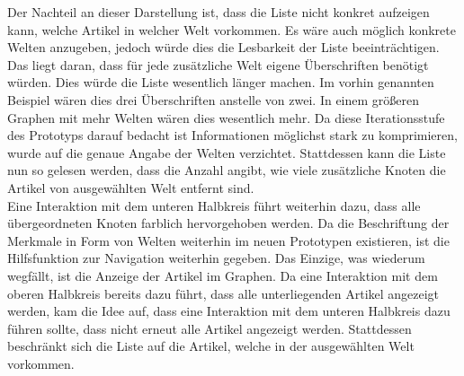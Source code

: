 Der Nachteil an dieser Darstellung ist, dass die Liste nicht konkret aufzeigen kann, welche Artikel in welcher Welt vorkommen.
Es wäre auch möglich konkrete Welten anzugeben, jedoch würde dies die Lesbarkeit der Liste beeinträchtigen.
Das liegt daran, dass für jede zusätzliche Welt eigene Überschriften benötigt würden.
Dies würde die Liste wesentlich länger machen.
Im vorhin genannten Beispiel wären dies drei Überschriften anstelle von zwei.
In einem größeren Graphen mit mehr Welten wären dies wesentlich mehr.
Da diese Iterationsstufe des Prototyps darauf bedacht ist Informationen möglichst stark zu komprimieren, wurde auf die genaue Angabe der Welten verzichtet.
Stattdessen kann die Liste nun so gelesen werden, dass die Anzahl angibt, wie viele zusätzliche Knoten die Artikel von ausgewählten Welt entfernt sind.\\

Eine Interaktion mit dem unteren Halbkreis führt weiterhin dazu, dass alle übergeordneten Knoten farblich hervorgehoben werden.
Da die Beschriftung der Merkmale in Form von Welten weiterhin im neuen Prototypen existieren, ist die Hilfsfunktion zur Navigation weiterhin gegeben.
Das Einzige, was wiederum wegfällt, ist die Anzeige der Artikel im Graphen.
Da eine Interaktion mit dem oberen Halbkreis bereits dazu führt, dass alle unterliegenden Artikel angezeigt werden, kam die Idee auf, dass eine Interaktion mit dem unteren Halbkreis dazu führen sollte, dass nicht erneut alle Artikel angezeigt werden.
Stattdessen beschränkt sich die Liste auf die Artikel, welche in der ausgewählten Welt vorkommen. \\

